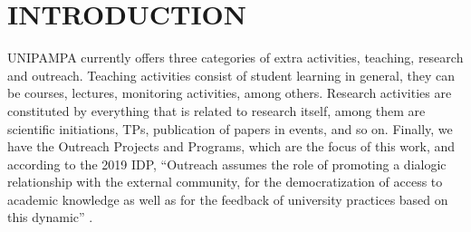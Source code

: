 \chapter{INTRODUCTION}\label{introduction}


\acl{UNIPAMPA} currently offers three categories of extra activities, teaching, research and outreach. 
Teaching activities consist of student learning in general, they can be courses, lectures, monitoring activities, among others. 
Research activities are constituted by everything that is related to research itself, among them are scientific initiations, \acp{TP}, publication of papers in events, and so on. 
Finally, we have the Outreach Projects and Programs, which are the focus of this work, and according to the 2019 \ac{IDP}, ``Outreach assumes the role of promoting a dialogic relationship with the external community, for the democratization of access to academic knowledge as well as for the feedback of university practices based on this dynamic'' \cite{PDI-Unipampa:2019-2023}.

